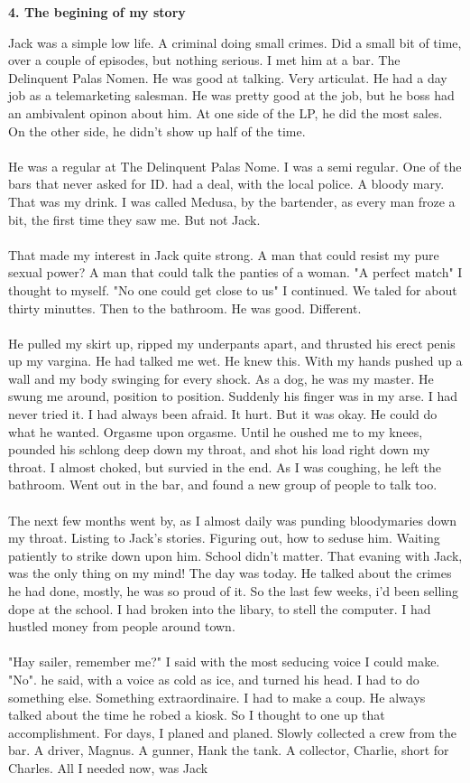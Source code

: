 \documentclass[]{article}
\begin{document}
\begin{center}
	\large\textbf{4. The begining of my story}
\end{center}

Jack was a simple low life. A criminal doing small crimes. Did a small bit of time, over a couple of episodes, but nothing serious. I met him at a bar. The Delinquent Palas Nomen. He was good at talking. Very articulat. He had a day job as a telemarketing salesman. He was pretty good at the job, but he boss had an ambivalent opinon about him. At one side of the LP, he did the most sales. On the other side, he didn't show up half of the time.
\\ \\
He was a regular at The Delinquent Palas Nome. I was a semi regular. One of the bars that never asked for ID. had a deal, with the local police. A bloody mary. That was my drink. I was called Medusa, by the bartender, as every man froze a bit, the first time they saw me. But not Jack.
\\ \\
That made my interest in Jack quite strong. A man that could resist my pure sexual power? A man that could talk the panties of a woman. "A perfect match" I thought to myself. "No one could get close to us" I continued. We taled for about thirty minuttes. Then to the bathroom. He was good. Different. 
\\ \\
He pulled my skirt up, ripped my underpants apart, and thrusted his erect penis up my vargina. He had talked me wet. He knew this. With my hands pushed up a wall and my body swinging for every shock. As a dog, he was my master. He swung me around, position to position. Suddenly his finger was in my arse. I had never tried it. I had always been afraid. It hurt. But it was okay. He could do what he wanted. Orgasme upon orgasme. Until he oushed me to my knees, pounded his schlong deep down my throat, and shot his load right down my throat. I almost choked, but survied in the end. As I was coughing, he left the bathroom. Went out in the bar, and found a new group of people to talk too.
\\ \\
The next few months went by, as I almost daily was punding bloodymaries down my throat. Listing to Jack's stories. Figuring out, how to seduse him. Waiting patiently to strike down upon him. School didn't matter. That evaning with Jack, was the only thing on my mind! The day was today. He talked about the crimes he had done, mostly, he was so proud of it. So the last few weeks, i'd been selling dope at the school. I had broken into the libary, to stell the computer. I had hustled money from people around town. 
\\ \\
"Hay sailer, remember me?" I said with the most seducing voice I could make. "No". he said, with a voice as cold as ice, and turned his head. I had to do something else. Something extraordinaire. I had to make a coup. He always talked about the time he robed a kiosk. So I thought to one up that accomplishment. For days, I planed and planed. Slowly collected a crew from the bar. A driver, Magnus. A gunner, Hank the tank. A collector, Charlie, short for Charles. All I needed now, was Jack
\end{document}
